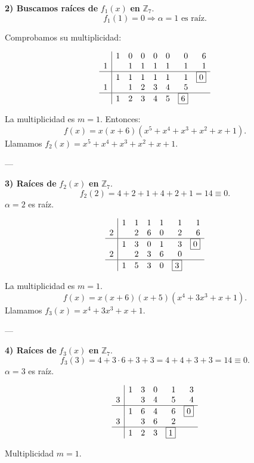\documentclass[a4paper,12pt]{article}
\begin{document}
\begin{ejercicio}[title=Ejercicio 52]

\textbf{2) Buscamos raíces de } \(f_1(x)\) \textbf{ en } \(\mathbb{Z}_7.\)
\[
f_1(1) = 0 \Rightarrow \alpha = 1 \text{ es raíz.}
\]

Comprobamos su multiplicidad:

\[
\begin{array}{r|rrrrrrr}
  & 1 & 0 & 0 & 0 & 0 & 0 & 6 \\
1 &   & 1 & 1 & 1 & 1 & 1 & 1 \\
\hline
  & 1 & 1 & 1 & 1 & 1 & 1 & \boxed{0} \\
1 &   & 1 & 2 & 3 & 4 & 5 \\
\hline
  & 1 & 2 & 3 & 4 & 5 & \boxed{6}
\end{array}
\]

La multiplicidad es \(m = 1\).  
Entonces:
\[
f(x) = x(x+6)(x^5 + x^4 + x^3 + x^2 + x + 1).
\]
Llamamos \(f_2(x) = x^5 + x^4 + x^3 + x^2 + x + 1.\)

---

\textbf{3) Raíces de } \(f_2(x)\) \textbf{ en } \(\mathbb{Z}_7.\)
\[
f_2(2) = 4 + 2 + 1 + 4 + 2 + 1 = 14 \equiv 0.
\]
\(\alpha = 2\) es raíz.

\[
\begin{array}{r|rrrrrr}
  & 1 & 1 & 1 & 1 & 1 & 1 \\
2 &   & 2 & 6 & 0 & 2 & 6 \\
\hline
  & 1 & 3 & 0 & 1 & 3 & \boxed{0} \\
2 &   & 2 & 3 & 6 & 0 \\
\hline
  & 1 & 5 & 3 & 0 & \boxed{3}
\end{array}
\]

La multiplicidad es \(m = 1\).  
\[
f(x) = x(x+6)(x+5)(x^4 + 3x^3 + x + 1).
\]
Llamamos \(f_3(x) = x^4 + 3x^3 + x + 1.\)

---

\textbf{4) Raíces de } \(f_3(x)\) \textbf{ en } \(\mathbb{Z}_7.\)
\[
f_3(3) = 4 + 3\cdot6 + 3 + 3 = 4 + 4 + 3 + 3 = 14 \equiv 0.
\]
\(\alpha = 3\) es raíz.

\[
\begin{array}{r|rrrrr}
  & 1 & 3 & 0 & 1 & 3 \\
3 &   & 3 & 4 & 5 & 4 \\
\hline
  & 1 & 6 & 4 & 6 & \boxed{0} \\
3 &   & 3 & 6 & 2 \\
\hline
  & 1 & 2 & 3 & \boxed{1}
\end{array}
\]

Multiplicidad \(m = 1\).

\end{ejercicio}
\end{document}
